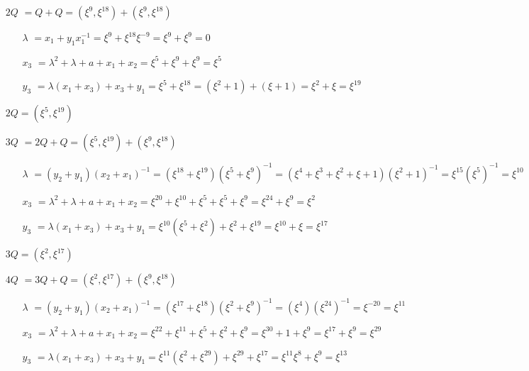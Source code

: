 \documentclass[fleqn]{article}
\begin{document}
    \begin{itemize}
        \item[$2Q$] $ = Q + Q = (\xi^9, \xi^{18}) + (\xi^9, \xi^{18})$
                    \begin{itemize}
                        \item[$\lambda$] $ = x_1 + y_1 x_1^{-1} = \xi^9 + \xi^{18} \xi^{-9} = \xi^9 + \xi^9 = 0$
                        \item[$x_3$] $ = \lambda^2 + \lambda + a + x_1 + x_2 = \xi^5 + \xi^9 + \xi^{9} = \xi^{5}$
                        \item[$y_3$] $ = \lambda(x_1 + x_3) + x_3 + y_1 = \xi^{5} + \xi^{18} = (\xi^2 + 1) + (\xi + 1) = \xi^2 + \xi = \xi^{19}$
                    \end{itemize}
                    $2Q = (\xi^{5}, \xi^{19})$
        \item[$3Q$] $ = 2Q + Q = (\xi^{5}, \xi^{19}) + (\xi^9, \xi^{18})$
                    \begin{itemize}
                        \item[$\lambda$] $ = (y_2 + y_1)(x_2 + x_1)^{-1} = (\xi^{18} + \xi^{19})(\xi^{5} + \xi^{9})^{-1} = (\xi^4 + \xi^3 + \xi^2 + \xi + 1)(\xi^2 + 1)^{-1} = \xi^{15} (\xi^{5})^{-1} = \xi^{10}$
                        \item[$x_3$] $ = \lambda^2 + \lambda + a + x_1 + x_2 = \xi^{20} + \xi^{10} + \xi^{5} + \xi^{5} + \xi^{9} = \xi^{24} + \xi^9 = \xi^2$
                        \item[$y_3$] $ = \lambda(x_1 + x_3) + x_3 + y_1 = \xi^{10}(\xi^5 + \xi^2) + \xi^2 + \xi^{19} = \xi^{10} + \xi = \xi^{17}$
                    \end{itemize}
                    $3Q = (\xi^{2}, \xi^{17})$
        \item[$4Q$] $ = 3Q + Q = (\xi^{2}, \xi^{17}) + (\xi^9, \xi^{18})$
            \begin{itemize}
                \item[$\lambda$] $ = (y_2 + y_1)(x_2 + x_1)^{-1} = (\xi^{17} + \xi^{18})(\xi^{2} + \xi^{9})^{-1} = (\xi^4)(\xi^{24})^{-1} = \xi^{-20} = \xi^{11}$
                \item[$x_3$] $ = \lambda^2 + \lambda + a + x_1 + x_2 = \xi^{22} + \xi^{11} + \xi^{5} + \xi^{2} + \xi^{9} = \xi^{30} + 1 + \xi^{9} = \xi^{17} + \xi^{9} = \xi^{29}$
                \item[$y_3$] $ = \lambda(x_1 + x_3) + x_3 + y_1 = \xi^{11} (\xi^{2} + \xi^{29}) + \xi^{29} + \xi^{17} = \xi^{11}\xi^{8} + \xi^{9} = \xi^{13}$

\end{itemize}
\end{itemize}
\end{document}

